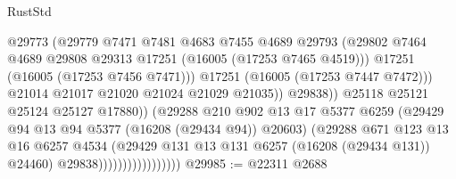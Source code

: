 \begin{lexlean}{RustStd}
\begin{coremodule}
                                                @29773
                                                (@29779
                                                  @7471
                                                  @7481
                                                  @4683
                                                  @7455
                                                  @4689
                                                  @29793
                                                  (@29802
                                                    @7464
                                                    @4689
                                                    @29808
                                                    @29313
                                                    @17251
                                                    (@16005 (@17253 @7465 @4519)))
                                                  @17251
                                                  (@16005 (@17253 @7456 @7471)))
                                                @17251
                                                (@16005 (@17253 @7447 @7472)))
                                              @21014
                                              @21017
                                              @21020
                                              @21024
                                              @21029
                                              @21035))
                                          @29838))
                                      @25118
                                      @25121
                                      @25124
                                      @25127
                                      @17880))
                                  (@29288
                                    @210
                                    @902
                                    @13
                                    @17
                                    @5377
                                    @6259
                                    (@29429 @94 @13 @94 @5377 (@16208 (@29434 @94)) @20603)
                                    (@29288
                                      @671
                                      @123
                                      @13
                                      @16
                                      @6257
                                      @4534
                                      (@29429 @131 @13 @131 @6257 (@16208 (@29434 @131)) @24460)
                                      @29838)))))))))))))))))
@29985 := @22311 @2688

\end{coremodule}
\end{lexlean}

